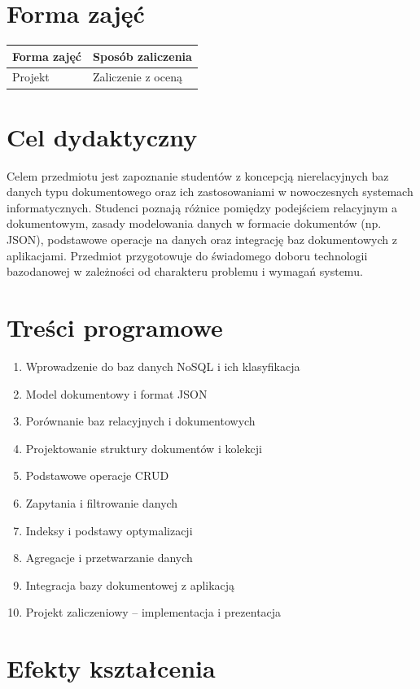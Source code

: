 \documentclass[12pt, a4paper]{article}
\begin{document}
\section{Forma zajęć}

\begin{tabular}{ll}
  \hline
  \textbf{Forma zajęć} & \textbf{Sposób zaliczenia} \\
  \hline
  Projekt & Zaliczenie z oceną \\
  \hline
\end{tabular}

\section{Cel dydaktyczny}

Celem przedmiotu jest zapoznanie studentów z koncepcją nierelacyjnych baz danych typu dokumentowego oraz ich zastosowaniami w nowoczesnych systemach informatycznych. Studenci poznają różnice pomiędzy podejściem relacyjnym a dokumentowym, zasady modelowania danych w formacie dokumentów (np. JSON), podstawowe operacje na danych oraz integrację baz dokumentowych z aplikacjami. Przedmiot przygotowuje do świadomego doboru technologii bazodanowej w zależności od charakteru problemu i wymagań systemu.

\section{Treści programowe}

\begin{enumerate}
  \item Wprowadzenie do baz danych NoSQL i ich klasyfikacja
  \item Model dokumentowy i format JSON
  \item Porównanie baz relacyjnych i dokumentowych
  \item Projektowanie struktury dokumentów i kolekcji
  \item Podstawowe operacje CRUD
  \item Zapytania i filtrowanie danych
  \item Indeksy i podstawy optymalizacji
  \item Agregacje i przetwarzanie danych
  \item Integracja bazy dokumentowej z aplikacją
  \item Projekt zaliczeniowy – implementacja i prezentacja
\end{enumerate}

\section{Efekty kształcenia}
\end{document}

